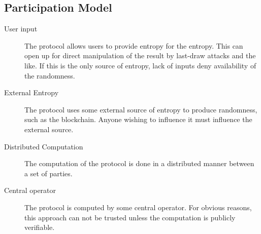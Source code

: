 \subsection{Participation Model}
\label{sub:participation_model}
\begin{description}
    \item [User input] The protocol allows users to provide entropy for the entropy. This can open up for direct manipulation of the result by last-draw attacks and the like. If this is the only source of entropy, lack of inputs deny availability of the randomness.  
    \item [External Entropy] The protocol uses some external source of entropy to produce randomness, such as the blockchain. Anyone wishing to influence it must influence the external source. 
    \item [Distributed Computation]
    The computation of the protocol is done in a distributed manner between a set of parties. 
    \item [Central operator] The protocol is computed by some central operator. For obvious reasons, this approach can not be trusted unless the computation is publicly verifiable. 
\end{description}

